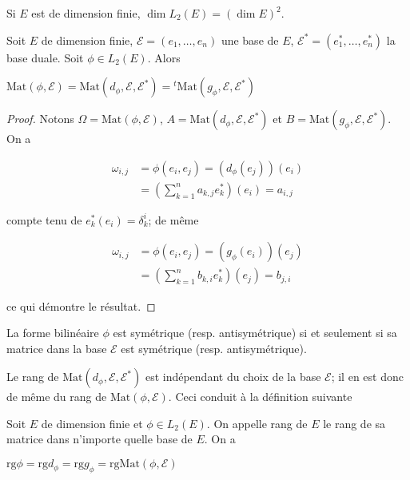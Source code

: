 \begin{thm}
Si $E$ est de dimension finie, $\dim L_2(E) = (\dim E)^2$.
\end{thm}

\begin{thm}
Soit $E$ de dimension finie, $\mathcal{E} = (e_1,\ldots,e_n)$ une base de $E$, $\mathcal{E}^* = (e_1^*,\ldots,e_n^*)$ la base duale. Soit $\phi \in L_2(E)$. Alors

$\mathrm{Mat}(\phi,\mathcal{E}) = \mathrm{Mat}(d_\phi,\mathcal{E},\mathcal{E}^*) = {}^t \mathrm{Mat}(g_\phi,\mathcal{E},\mathcal{E}^*)$
\end{thm}

\begin{proof}
Notons $\Omega = \mathrm{Mat}(\phi,\mathcal{E})$, $A = \mathrm{Mat}(d_\phi,\mathcal{E},\mathcal{E}^*)$ et $B = \mathrm{Mat}(g_\phi,\mathcal{E},\mathcal{E}^*)$. On a

\begin{align*}
\omega_{i,j} &= \phi(e_i,e_j) = (d_\phi(e_j))(e_i) \\
&= (\sum_{k=1}^n a_{k,j} e_k^*)(e_i) = a_{i,j}
\end{align*}

compte tenu de $e_k^*(e_i) = \delta_k^i$; de même

\begin{align*}
\omega_{i,j} &= \phi(e_i,e_j) = (g_\phi(e_i))(e_j) \\
&= (\sum_{k=1}^n b_{k,i} e_k^*)(e_j) = b_{j,i}
\end{align*}

ce qui démontre le résultat.
\end{proof}

\begin{thm}
La forme bilinéaire $\phi$ est symétrique (resp. antisymétrique) si et seulement si sa matrice dans la base $\mathcal{E}$ est symétrique (resp. antisymétrique).
\end{thm}

Le rang de $\mathrm{Mat}(d_\phi,\mathcal{E},\mathcal{E}^*)$ est indépendant du choix de la base $\mathcal{E}$; il en est donc de même du rang de $\mathrm{Mat}(\phi,\mathcal{E})$. Ceci conduit à la définition suivante

\begin{de}
Soit $E$ de dimension finie et $\phi \in L_2(E)$. On appelle rang de $E$ le rang de sa matrice dans n'importe quelle base de $E$. On a

$\mathrm{rg} \phi = \mathrm{rg} d_\phi = \mathrm{rg} g_\phi = \mathrm{rg} \mathrm{Mat}(\phi,\mathcal{E})$
\end{de}

